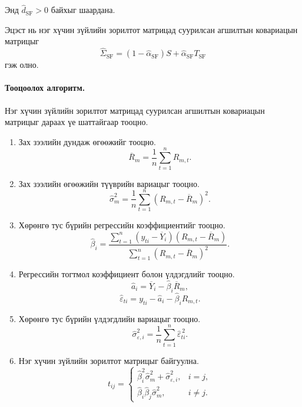 Энд $\widehat d_{\mathrm{SF}}>0$
байхыг шаардана.

Эцэст нь нэг хүчин зүйлийн зорилтот
матрицад суурилсан агшилтын ковариацын
матрицыг
\[
\widehat{\Sigma}_{\mathrm{SF}}
=
(1-\widehat{\alpha}_{\mathrm{SF}})S
+
\widehat{\alpha}_{\mathrm{SF}}T_{\mathrm{SF}}
\]
гэж олно.

\paragraph{Тооцоолох алгоритм.}

Нэг хүчин зүйлийн зорилтот матрицад
суурилсан агшилтын ковариацын
матрицыг дараах үе шаттайгаар тооцно.

\begin{enumerate}
	
	\item Зах зээлийн дундаж өгөөжийг тооцно.
	\[
	\overline{R}_m
	=
	\frac{1}{n}
	\sum_{t=1}^{n}R_{m,t}.
	\]
	

	
	\item Зах зээлийн өгөөжийн түүврийн
	вариацыг тооцно.
	\[
	\widehat{\sigma}_m^2
	=
	\frac{1}{n}
	\sum_{t=1}^{n}
	(R_{m,t}-\overline{R}_m)^2.
	\]
	
	\item Хөрөнгө тус бүрийн регрессийн
	коэффициентийг тооцно.
	\[
	\widehat{\beta}_i
	=
	\frac{
		\sum_{t=1}^{n}
		(y_{ti}-\overline{Y}_i)
		(R_{m,t}-\overline{R}_m)
	}{
		\sum_{t=1}^{n}
		(R_{m,t}-\overline{R}_m)^2
	}.
	\]
	
	\item Регрессийн тогтмол коэффициент
	болон үлдэгдлийг тооцно.
	\[
	\widehat a_i
	=
	\overline{Y}_i
	-
	\widehat{\beta}_i\overline{R}_m,
	\]
	\[
	\widehat{\varepsilon}_{ti}
	=
	y_{ti}
	-
	\widehat a_i
	-
	\widehat{\beta}_iR_{m,t}.
	\]
	
	\item Хөрөнгө тус бүрийн үлдэгдлийн
	вариацыг тооцно.
	\[
	\widehat{\sigma}_{\varepsilon,i}^{2}
	=
	\frac{1}{n}
	\sum_{t=1}^{n}
	\widehat{\varepsilon}_{ti}^{\,2}.
	\]
	
	\item Нэг хүчин зүйлийн зорилтот
	матрицыг байгуулна.
	\[
	t_{ij}
	=
	\begin{cases}
		\widehat{\beta}_i^2
		\widehat{\sigma}_m^2
		+
		\widehat{\sigma}_{\varepsilon,i}^{2},
		& i=j,\\[0.4em]
		\widehat{\beta}_i\widehat{\beta}_j
		\widehat{\sigma}_m^2,
		& i\neq j.
	\end{cases}
	\]
	

\end{enumerate}

